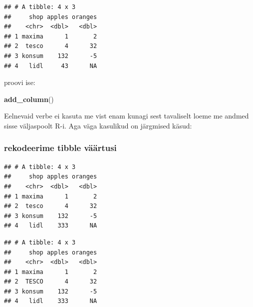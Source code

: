 \documentclass[]{book}
\newenvironment{Shaded}{\begin{snugshade}}{\end{snugshade}}
\newcommand{\KeywordTok}[1]{\textcolor[rgb]{0.13,0.29,0.53}{\textbf{#1}}}
\newcommand{\DecValTok}[1]{\textcolor[rgb]{0.00,0.00,0.81}{#1}}
\newcommand{\StringTok}[1]{\textcolor[rgb]{0.31,0.60,0.02}{#1}}
\newcommand{\OperatorTok}[1]{\textcolor[rgb]{0.81,0.36,0.00}{\textbf{#1}}}
\newcommand{\NormalTok}[1]{#1}
\begin{document}
\begin{verbatim}
## # A tibble: 4 x 3
##     shop apples oranges
##    <chr>  <dbl>   <dbl>
## 1 maxima      1       2
## 2  tesco      4      32
## 3 konsum    132      -5
## 4   lidl     43      NA
\end{verbatim}

proovi ise:

\begin{Shaded}
\begin{Highlighting}[]
\KeywordTok{add_column}\NormalTok{()}
\end{Highlighting}
\end{Shaded}

Eelnevaid verbe ei kasuta me vist enam kunagi sest tavaliselt loeme me
andmed sisse väljaspoolt R-i. Aga väga kasulikud on järgmised käsud:

\subsubsection{rekodeerime tibble
väärtusi}\label{rekodeerime-tibble-vaartusi}

\begin{Shaded}
\end{Shaded}

\begin{verbatim}
## # A tibble: 4 x 3
##     shop apples oranges
##    <chr>  <dbl>   <dbl>
## 1 maxima      1       2
## 2  tesco      4      32
## 3 konsum    132      -5
## 4   lidl    333      NA
\end{verbatim}

\begin{Shaded}
\end{Shaded}

\begin{verbatim}
## # A tibble: 4 x 3
##     shop apples oranges
##    <chr>  <dbl>   <dbl>
## 1 maxima      1       2
## 2  TESCO      4      32
## 3 konsum    132      -5
## 4   lidl    333      NA
\end{verbatim}
\end{document}
